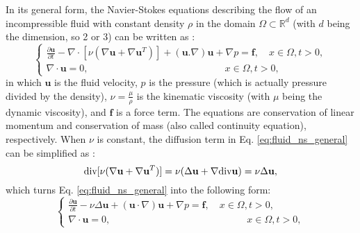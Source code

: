 In its general form, the Navier-Stokes equations describing the flow of an incompressible fluid with constant density $\rho$ in the domain $\Omega \subset \mathbb{R}^{d}$ (with $d$ being the dimension, so 2 or 3) can be written as \cite{Chung2014}:
\begin{equation} \label{eq:fluid_ns_general}
\left\{ {\begin{array}{*{20}{l}}
\displaystyle  {\frac{{\partial {\mathbf{u}}}}{{\partial t}} - {\nabla\cdot}[\nu(\nabla {\mathbf{u}} + \nabla {{\mathbf{u}}^T})] + ({\mathbf{u}}.\nabla ){\mathbf{u}} + \nabla p = {\mathbf{f}},\quad x \in \Omega ,t > 0,} \\
\displaystyle  {\nabla\cdot{\mathbf{u}} = 0,\quad \quad \quad \quad \quad \quad \quad \quad \quad \quad \quad \quad \quad \quad x \in \Omega ,t > 0,}
\end{array}} \right.
\end{equation}
in which $\mathbf{u}$ is the fluid velocity, $p$ is the pressure (which is actually pressure divided by the density), $\nu = \frac{\mu}{\rho}$ is the kinematic viscosity (with $\mu$ being the dynamic viscosity), and
$\mathbf{f}$ is a force term. The equations are conservation of linear momentum and conservation of mass (also called continuity equation), respectively. When $\nu$ is constant, the diffusion term in Eq. \ref{eq:fluid_ns_general} can be simplified as \cite{Quarteroni2014}:
\begin{equation}
\text{div} [\nu(\nabla {\bf u}+\nabla {\bf u}^{T})] =\nu (\Delta {\bf u} + \nabla \text{div} {\bf u})=\nu \Delta {\bf u},
\end{equation}
which turns Eq. \ref{eq:fluid_ns_general} into the following form:
\begin{equation}  \label{eq:fluid_ns}
\left\{ {\begin{array}{*{20}{l}}
\displaystyle  {\frac{{\partial {\mathbf{u}}}}{{\partial t}} - \nu\Delta{\mathbf{u}} + \left( {{\mathbf{u}} \cdot \nabla } \right) {\mathbf{u}} + \nabla p = {\mathbf{f}},\quad x \in \Omega ,t > 0,} \\
 \displaystyle {\nabla\cdot{\mathbf{u}} = 0,\quad \quad \quad \quad \quad \quad \quad \quad \quad \quad \quad \quad \quad \quad x \in \Omega ,t > 0,}
\end{array}} \right.
\end{equation}

